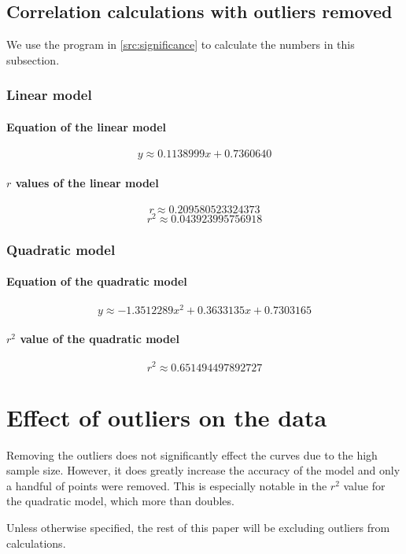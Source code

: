 \subsection{Correlation calculations with outliers removed}
We use the program in \vref{src:significance} to calculate the numbers in this subsection.

\subsubsection{Linear model}
\paragraph{Equation of the linear model}
\[y \approx \num{0.1138999}x + \num{0.7360640}\]
\paragraph{$r$ values of the linear model}
\[r \approx \num{0.209580523324373}\]
\[r^2 \approx \num{0.043923995756918}\]

\subsubsection{Quadratic model}
\paragraph{Equation of the quadratic model}
\[y \approx \num{-1.3512289}x^2 + \num{0.3633135}x + \num{0.7303165}\]
\paragraph{$r^2$ value of the quadratic model}
\[r^2 \approx \num{0.651494497892727}\]

\section{Effect of outliers on the data}
Removing the outliers does not significantly effect the curves due to the high sample size.
However, it does greatly increase the accuracy of the model and only a handful of points were removed.
This is especially notable in the $r^2$ value for the quadratic model, which more than doubles.

Unless otherwise specified, the rest of this paper will be excluding outliers from calculations.
